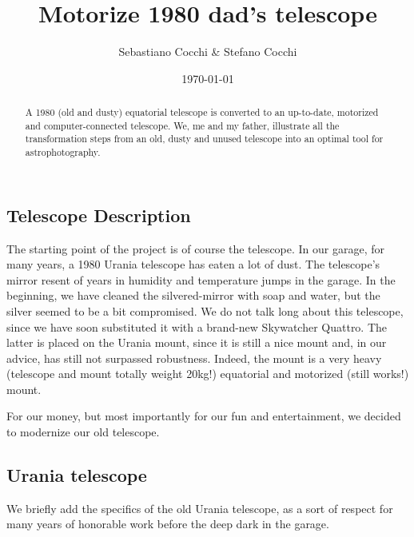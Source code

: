 \documentclass{article}
\title{Motorize 1980 dad's telescope}
\author{Sebastiano Cocchi \& Stefano Cocchi}
\date{\today}
\begin{document}
    
    \maketitle

    \begin{abstract}
        A 1980 (old and dusty) equatorial telescope is converted to an up-to-date, motorized and computer-connected telescope.
        We, me and my father, illustrate all the transformation steps from an old, dusty and unused telescope into an optimal tool for astrophotography.
    \end{abstract}

    \tableofcontents

    \begin{multicols}{2}
        \section{Telescope Description}
        The starting point of the project is of course the telescope.
        In our garage, for many years, a 1980 Urania telescope has eaten a lot of dust.
        The telescope's mirror resent of years in humidity and temperature jumps in the garage.
        In the beginning, we have cleaned the silvered-mirror with soap and water, but the silver seemed to be a bit compromised.
        We do not talk long about this telescope, since we have soon substituted it with a brand-new Skywatcher Quattro.
        The latter is placed on the Urania mount, since it is still a nice mount and, in our advice, has still not surpassed robustness.
        Indeed, the mount is a very heavy (telescope and mount totally weight 20kg!) equatorial and motorized (still works!) mount.
        
        For our money, but most importantly for our fun and entertainment, we decided to modernize our old telescope.

        \subsection{Urania telescope}
        We briefly add the specifics of the old Urania telescope, as a sort of respect for many years of honorable work before the deep dark in the garage.


\end{multicols}
\end{document}
